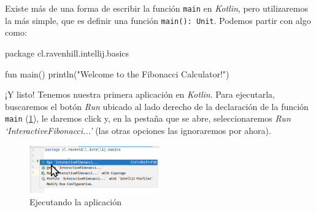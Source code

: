   Existe más de una forma de escribir la función \texttt{main} en \textit{Kotlin}, pero 
  utilizaremos la más simple, que es definir una función \texttt{main(): Unit}.
  Podemos partir con algo como:

  \begin{kotlin}
    package cl.ravenhill.intellij.basics

    fun main() {
      println("Welcome to the Fibonacci Calculator!")
    }
  \end{kotlin}

  ¡Y listo! 
  Tenemos nuestra primera aplicación en \textit{Kotlin}.
  Para ejecutarla, buscaremos el botón \textit{Run} ubicado al lado derecho de la declaración de 
  la función \texttt{main} (\cref{fig:idea64_run_button}), le daremos click y, en la pestaña que
  se abre, seleccionaremos \textit{Run `InteractiveFibonacci...'} (las otras opciones las 
  ignoraremos por ahora).

  \begin{figure}[ht!]
    \centering
    \includegraphics[width=0.5\textwidth]{img/Por_algo_se_empieza/idea64_run_button.png}
    \caption{Ejecutando la aplicación}
    \label{fig:idea64_run_button}
  \end{figure}